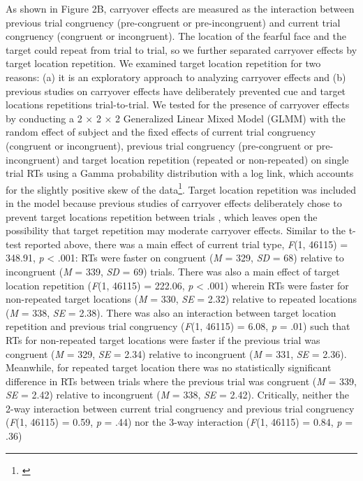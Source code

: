 \documentclass{article}
\begin{document}
	As shown in Figure 2B, carryover effects are measured as the interaction between previous trial congruency (pre-congruent or pre-incongruent) and current trial congruency (congruent or incongruent). The location of the fearful face and the target could repeat from trial to trial, so we further separated carryover effects by target location repetition. We examined target location repetition for two reasons: (a) it is an exploratory approach to analyzing carryover effects and (b) previous studies on carryover effects \autocite{Gladwin2019a} have deliberately prevented cue and target locations repetitions trial-to-trial. We tested for the presence of carryover effects by conducting a 2 × 2 × 2 Generalized Linear Mixed Model (GLMM) with the random effect of subject and the fixed effects of current trial congruency (congruent or incongruent), previous trial congruency (pre-congruent or pre-incongruent) and target location repetition (repeated or non-repeated) on single trial RTs using a Gamma probability distribution with a log link, which accounts for the slightly positive skew of the data\footnote{{\color{ }}{\color{We also tested a model with a random slope for congruency x previous congruency x target location repetition interaction. Although }}{\color{this}}{\color{ model fit our data better (AIC}}\textsubscript{{\color{without random slope}}}{\color{ = -26903.474 whereas AIC}}\textsubscript{{\color{with random slope}}}{\color{ = -27133.846}}{\color{;}}{\color{models with smaller AIC values fit better), the significant levels of all the fixed effect}}{\color{s}}{\color{ for this model was very similar to the one reported in the main text, where there was no significant carryover effect.}}}. Target location repetition was included in the model because previous studies of carryover effects deliberately chose to prevent target locations repetition between trials \autocite{Gladwin2019a}, which leaves open the possibility that target repetition may moderate carryover effects. Similar to the t-test reported above, there was a main effect of current trial type, \emph{F}(1, 46115) = 348.91, \emph{p }< .001: RTs were faster on congruent (\emph{M }= 329, \emph{SD}\emph{ }= 68) relative to incongruent (\emph{M }= 339, \emph{SD }= 69) trials. There was also a main effect of target location repetition (\emph{F}(1, 46115) = 222.06, \emph{p }< .001) wherein RTs were faster for non-repeated target locations (\emph{M }= 330, \emph{SE }= 2.32) relative to repeated locations (\emph{M }= 338, \emph{SE }= 2.38). There was also an interaction between target location repetition and previous trial congruency (\emph{F}(1, 46115) = 6.08, \emph{p }= .01) such that RTs for non-repeated target locations were faster if the previous trial was congruent (\emph{M }= 329, \emph{SE }= 2.34) relative to incongruent (\emph{M }= 331, \emph{SE }= 2.36). Meanwhile, for repeated target location there was no statistically significant difference in RTs between trials where the previous trial was congruent (\emph{M }= 339, \emph{SE }= 2.42) relative to incongruent (\emph{M }= 338, \emph{SE }= 2.42). Critically, neither the 2-way interaction between current trial congruency and previous trial congruency (\emph{F}(1, 46115) = 0.59, \emph{p }= .44) nor the 3-way interaction (\emph{F}(1, 46115) = 0.84, \emph{p }= .36) 
\end{document}
